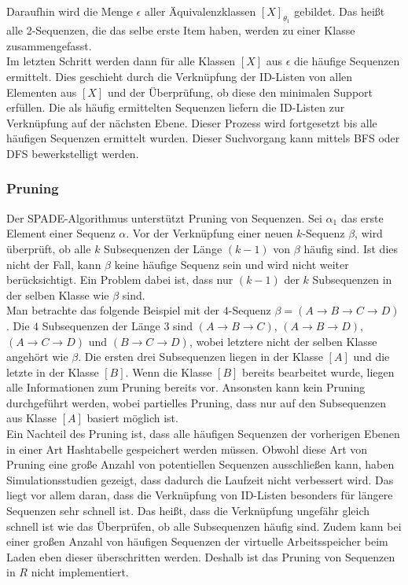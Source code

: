 Daraufhin wird die Menge $\epsilon$ aller Äquivalenzklassen $[X]_{\theta_1}$ gebildet. Das heißt alle 2-Sequenzen, die das selbe erste Item haben, werden zu einer Klasse zusammengefasst.\\
Im letzten Schritt werden dann für alle Klassen $[X]$ aus $\epsilon$ die häufige Sequenzen ermittelt. Dies geschieht durch die Verknüpfung der ID-Listen von allen Elementen aus $[X]$ und der Überprüfung, ob diese den minimalen Support erfüllen. Die als häufig ermittelten Sequenzen liefern die ID-Listen zur Verknüpfung auf der nächsten Ebene. Dieser Prozess wird fortgesetzt bis alle häufigen Sequenzen ermittelt wurden. Dieser Suchvorgang kann mittels BFS oder DFS bewerkstelligt werden.\\

\subsubsection*{Pruning}
Der SPADE-Algorithmus unterstützt Pruning von Sequenzen. Sei $\alpha_1$ das erste Element einer Sequenz $\alpha$. Vor der Verknüpfung einer neuen $k$-Sequenz $\beta$, wird überprüft, ob alle $k$ Subsequenzen der Länge $(k-1)$ von $\beta$ häufig sind. Ist dies nicht der Fall, kann $\beta$ keine häufige Sequenz sein und wird nicht weiter berücksichtigt. Ein Problem dabei ist, dass nur $(k-1)$ der $k$ Subsequenzen in der selben Klasse wie $\beta$ sind.\\
Man betrachte das folgende Beispiel mit der $4$-Sequenz $\beta = (A\rightarrow B\rightarrow C\rightarrow D)$. Die $4$ Subsequenzen der Länge $3$ sind $(A\rightarrow B\rightarrow C)$, $(A\rightarrow B\rightarrow D)$, $(A\rightarrow C\rightarrow D)$ und $(B\rightarrow C\rightarrow D)$, wobei letztere nicht der selben Klasse angehört wie $\beta$. Die ersten drei Subsequenzen liegen in der Klasse $[A]$ und die letzte in der Klasse $[B]$. Wenn die Klasse $[B]$ bereits bearbeitet wurde, liegen alle Informationen zum Pruning bereits vor. Ansonsten kann kein Pruning durchgeführt werden, wobei partielles Pruning, dass nur auf den Subsequenzen aus Klasse $[A]$ basiert möglich ist.\\
Ein Nachteil des Pruning ist, dass alle häufigen Sequenzen der vorherigen Ebenen in einer Art Hashtabelle gespeichert werden müssen. Obwohl diese Art von Pruning eine große Anzahl von potentiellen Sequenzen ausschließen kann, haben Simulationsstudien \cite{spade} gezeigt, dass dadurch die Laufzeit nicht verbessert wird. Das liegt vor allem daran, dass die Verknüpfung von ID-Listen besonders für längere Sequenzen sehr schnell ist. Das heißt, dass die Verknüpfung ungefähr gleich schnell ist wie das Überprüfen, ob alle Subsequenzen häufig sind. Zudem kann bei einer großen Anzahl von häufigen Sequenzen der virtuelle Arbeitsspeicher beim Laden eben dieser überschritten werden. Deshalb ist das Pruning von Sequenzen in $R$ nicht implementiert.